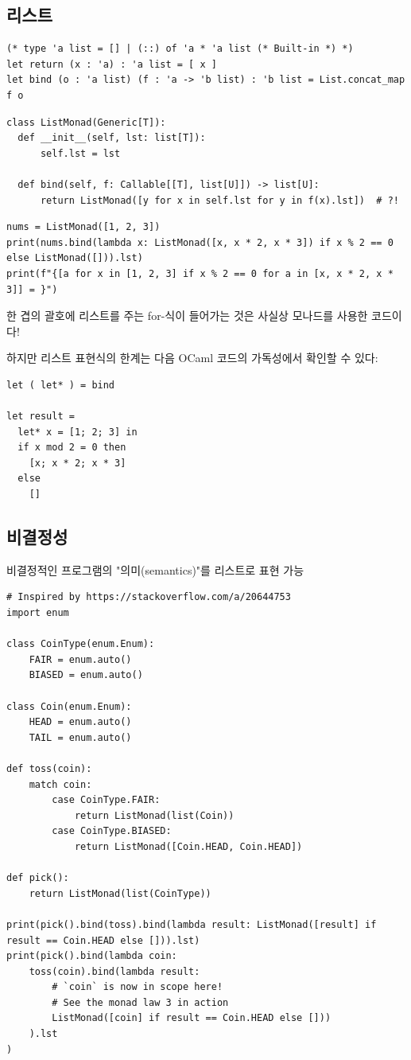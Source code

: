 \documentclass[a4paper,11pt]{article}
\begin{document}
\subsection{리스트}
\label{sec:orgf243b2f}
\begin{verbatim}
(* type 'a list = [] | (::) of 'a * 'a list (* Built-in *) *)
let return (x : 'a) : 'a list = [ x ]
let bind (o : 'a list) (f : 'a -> 'b list) : 'b list = List.concat_map f o
\end{verbatim}

\begin{verbatim}
class ListMonad(Generic[T]):
  def __init__(self, lst: list[T]):
      self.lst = lst

  def bind(self, f: Callable[[T], list[U]]) -> list[U]:
      return ListMonad([y for x in self.lst for y in f(x).lst])  # ?!
\end{verbatim}

\begin{verbatim}
nums = ListMonad([1, 2, 3])
print(nums.bind(lambda x: ListMonad([x, x * 2, x * 3]) if x % 2 == 0 else ListMonad([])).lst)
print(f"{[a for x in [1, 2, 3] if x % 2 == 0 for a in [x, x * 2, x * 3]] = }")
\end{verbatim}

한 겹의 괄호에 리스트를 주는 for-식이 들어가는 것은 사실상 모나드를 사용한 코드이다!

하지만 리스트 표현식의 한계는 다음 OCaml 코드의 가독성에서 확인할 수 있다:
\begin{verbatim}
let ( let* ) = bind

let result =
  let* x = [1; 2; 3] in
  if x mod 2 = 0 then
    [x; x * 2; x * 3]
  else
    []
\end{verbatim}

\subsection{비결정성}
\label{sec:org75a5699}
\label{org9729d4a}
비결정적인 프로그램의 "의미(semantics)"를 리스트로 표현 가능
\begin{verbatim}
# Inspired by https://stackoverflow.com/a/20644753
import enum

class CoinType(enum.Enum):
    FAIR = enum.auto()
    BIASED = enum.auto()

class Coin(enum.Enum):
    HEAD = enum.auto()
    TAIL = enum.auto()

def toss(coin):
    match coin:
        case CoinType.FAIR:
            return ListMonad(list(Coin))
        case CoinType.BIASED:
            return ListMonad([Coin.HEAD, Coin.HEAD])

def pick():
    return ListMonad(list(CoinType))

print(pick().bind(toss).bind(lambda result: ListMonad([result] if result == Coin.HEAD else [])).lst)
print(pick().bind(lambda coin:
    toss(coin).bind(lambda result:
        # `coin` is now in scope here!
        # See the monad law 3 in action
        ListMonad([coin] if result == Coin.HEAD else []))
    ).lst
)
\end{verbatim}
\end{document}
